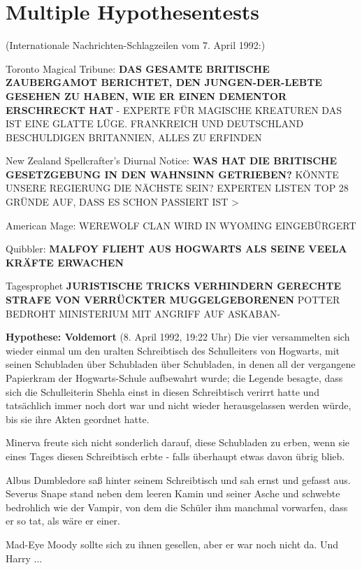 \chapter{Multiple Hypothesentests}

(Internationale Nachrichten-Schlagzeilen vom 7. April 1992:)

Toronto Magical Tribune:  \textbf{DAS GESAMTE BRITISCHE ZAUBERGAMOT BERICHTET,
DEN \glqq{}JUNGEN-DER-LEBTE\grqq{} GESEHEN ZU HABEN, WIE ER EINEN DEMENTOR
ERSCHRECKT HAT}   - EXPERTE FÜR MAGISCHE KREATUREN \glqq{}DAS IST EINE GLATTE
LÜGE\grqq{}. FRANKREICH UND DEUTSCHLAND BESCHULDIGEN BRITANNIEN,    ALLES ZU
ERFINDEN

New Zealand Spellcrafter's Diurnal Notice: \textbf{WAS HAT DIE BRITISCHE
GESETZGEBUNG IN DEN WAHNSINN GETRIEBEN?}    KÖNNTE UNSERE REGIERUNG DIE NÄCHSTE
SEIN?   EXPERTEN LISTEN TOP 28 GRÜNDE AUF, DASS ES SCHON PASSIERT IST   >

American Mage:  WEREWOLF CLAN WIRD IN WYOMING EINGEBÜRGERT

Quibbler:  \textbf{MALFOY FLIEHT AUS HOGWARTS ALS SEINE VEELA KRÄFTE ERWACHEN}

Tagesprophet  \textbf{JURISTISCHE TRICKS VERHINDERN GERECHTE STRAFE VON
\glqq{}VERRÜCKTER MUGGELGEBORENEN\grqq{}} POTTER BEDROHT MINISTERIUM MIT ANGRIFF
AUF ASKABAN-

\textbf{Hypothese: Voldemort} (8. April 1992, 19:22 Uhr) Die vier versammelten
sich wieder einmal um den uralten Schreibtisch des Schulleiters von Hogwarts,
mit seinen Schubladen über Schubladen über Schubladen, in denen all der
vergangene Papierkram der Hogwarts-Schule aufbewahrt wurde; die Legende besagte,
dass sich die Schulleiterin Shehla einst in diesen Schreibtisch verirrt hatte
und tatsächlich immer noch dort war und nicht wieder herausgelassen werden
würde, bis sie ihre Akten geordnet hatte.

Minerva freute sich nicht sonderlich darauf, diese Schubladen zu erben, wenn sie
eines Tages diesen Schreibtisch erbte - falls überhaupt etwas davon übrig blieb.

Albus Dumbledore saß hinter seinem Schreibtisch und sah ernst und gefasst aus.
Severus Snape stand neben dem leeren Kamin und seiner Asche und schwebte
bedrohlich wie der Vampir, von dem die Schüler ihm manchmal vorwarfen, dass er
so tat, als wäre er einer.

Mad-Eye Moody sollte sich zu ihnen gesellen, aber er war noch nicht da. Und
Harry ...

